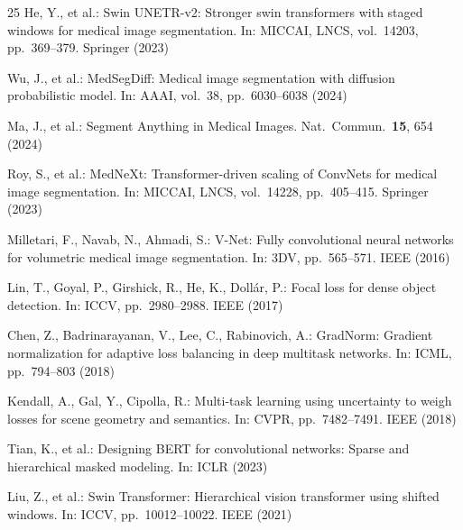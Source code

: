 \documentclass[runningheads]{llncs}
\begin{document}
\begin{thebibliography}{25}
He, Y., et al.:
Swin UNETR-v2: Stronger swin transformers with staged windows for medical
image segmentation.
In: MICCAI, LNCS, vol.~14203, pp.~369--379. Springer (2023)

Wu, J., et al.:
MedSegDiff: Medical image segmentation with diffusion probabilistic model.
In: AAAI, vol.~38, pp.~6030--6038 (2024)

Ma, J., et al.:
Segment Anything in Medical Images.
Nat.\ Commun.\ \textbf{15}, 654 (2024)

Roy, S., et al.:
MedNeXt: Transformer-driven scaling of ConvNets for medical image segmentation.
In: MICCAI, LNCS, vol.~14228, pp.~405--415. Springer (2023)

Milletari, F., Navab, N., Ahmadi, S.:
V-Net: Fully convolutional neural networks for volumetric medical image
segmentation. In: 3DV, pp.~565--571. IEEE (2016)

Lin, T., Goyal, P., Girshick, R., He, K., Doll{\'a}r, P.:
Focal loss for dense object detection.
In: ICCV, pp.~2980--2988. IEEE (2017)

Chen, Z., Badrinarayanan, V., Lee, C., Rabinovich, A.:
GradNorm: Gradient normalization for adaptive loss balancing in deep multitask
networks.
In: ICML, pp.~794--803 (2018)

Kendall, A., Gal, Y., Cipolla, R.:
Multi-task learning using uncertainty to weigh losses for scene geometry
and semantics.
In: CVPR, pp.~7482--7491. IEEE (2018)

Tian, K., et al.:
Designing BERT for convolutional networks: Sparse and hierarchical masked modeling.
In: ICLR (2023)

Liu, Z., et al.:
Swin Transformer: Hierarchical vision transformer using shifted windows.
In: ICCV, pp.~10012--10022. IEEE (2021)

\end{thebibliography}
\end{document}
